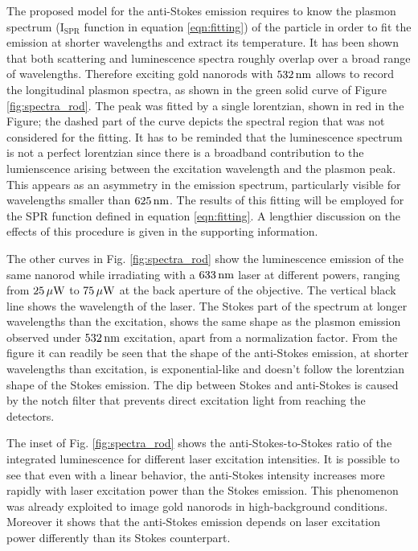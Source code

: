 The proposed model for the anti-Stokes emission requires to know the plasmon
spectrum ($\textrm{I}_{\textrm{SPR}}$ function in equation \ref{eqn:fitting}) of
the particle in order to fit the emission at shorter wavelengths and extract its
temperature. It has been shown that both scattering and luminescence spectra
roughly overlap over a broad range of wavelengths\cite{Yorulmaz2012}. Therefore
exciting gold nanorods with $532\,\textrm{nm}$ allows to record the longitudinal plasmon
spectra, as shown in the green solid curve of Figure \ref{fig:spectra_rod}. The
peak was fitted by a single lorentzian, shown in red in the Figure; the dashed
part of the curve depicts the spectral region that was not considered for the
fitting. It has to be reminded that the luminescence spectrum is not a perfect
lorentzian since there is a broadband contribution to the lumienscence arising
between the excitation wavelength and the plasmon peak\cite{Boyd1986}. This
appears as an asymmetry in the emission spectrum, particularly visible for
wavelengths smaller than $625\,\textrm{nm}$. The results of this fitting will be employed
for the SPR function defined in equation \ref{eqn:fitting}. A lengthier
discussion on the effects of this procedure is given in the supporting
information.

The other curves in Fig. \ref{fig:spectra_rod} show the luminescence emission of
the same nanorod while irradiating with a $633\,\textrm{nm}$ laser at different powers,
ranging from $25\,\mu\textrm{W}$ to $75\,\mu\textrm{W}$ at the back aperture of the objective. The
vertical black line shows the wavelength of the laser. The Stokes part of the
spectrum at longer wavelengths than the excitation, shows the same shape as the
plasmon emission observed under $532\,\textrm{nm}$ excitation, apart from a normalization
factor. From the figure it can readily be seen that the shape of the anti-Stokes
emission, at shorter wavelengths than excitation, is exponential-like and
doesn't follow the lorentzian shape of the Stokes emission. The dip between
Stokes and anti-Stokes is caused by the notch filter that prevents direct
excitation light from reaching the detectors.

The inset of Fig. \ref{fig:spectra_rod} shows the anti-Stokes-to-Stokes ratio of
the integrated luminescence for different laser excitation intensities. It is
possible to see that even with a linear behavior, the anti-Stokes intensity
increases more rapidly with laser excitation power than the Stokes emission.
This phenomenon was already exploited to image gold nanorods in high-background
conditions. Moreover it shows that the anti-Stokes emission depends on
laser excitation power differently than its Stokes counterpart. 

